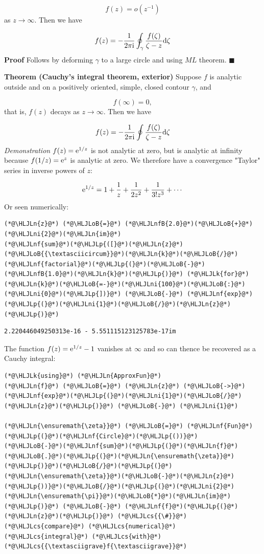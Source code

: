 \documentclass[12pt,a4paper]{article}
\newcommand{\HLJLk}[1]{\textcolor[RGB]{148,91,176}{\textbf{#1}}}
\newcommand{\HLJLn}[1]{#1}
\newcommand{\HLJLnf}[1]{\textcolor[RGB]{66,102,213}{#1}}
\newcommand{\HLJLnfB}[1]{\textcolor[RGB]{59,151,46}{#1}}
\newcommand{\HLJLni}[1]{\textcolor[RGB]{59,151,46}{#1}}
\newcommand{\HLJLoB}[1]{\textcolor[RGB]{102,102,102}{\textbf{#1}}}
\newcommand{\HLJLp}[1]{#1}
\newcommand{\HLJLcs}[1]{\textcolor[RGB]{153,153,119}{\textit{#1}}}
\def\D{ {\rm d} }
\def\I{ {\rm i} }
\def\E{ {\rm e} }
\begin{document}
\[
f(z) = o(z^{-1})
\]
as $z \rightarrow \infty$.  Then we have

\[
f(z) = -{1 \over 2 \pi \I} \oint_\gamma {f(\zeta) \over \zeta - z} \D \zeta
\]
\textbf{Proof} Follows by deforming $\gamma$ to a large circle and using $ML$ theorem. \ensuremath{\blacksquare}

\textbf{Theorem (Cauchy's integral theorem, exterior)} Suppose $f$ is analytic outside and on a positively oriented, simple, closed contour $\gamma$, and 

\[
f(\infty) = 0,
\]
that is, $f(z)$ decays as $z \rightarrow \infty$. Then we have

\[
f(z) = -{1 \over 2 \pi \I} \oint {f(\zeta) \over \zeta - z} \D \zeta
\]
\emph{Demonstration} $f(z) = \E^{1/z}$ is not analytic at zero, but is analytic at infinity because $f(1/z) = \E^z$ is analytic at zero. We therefore have a convergence "Taylor" series in inverse powers of $z$:

\[
\E^{1/z} = 1 + {1 \over z} + {1 \over 2 z^2} + {1 \over 3! z^3} + \cdots
\]
Or seen numerically:


\begin{lstlisting}
(*@\HLJLn{z}@*) (*@\HLJLoB{=}@*) (*@\HLJLnfB{2.0}@*)(*@\HLJLoB{+}@*)(*@\HLJLni{2}@*)(*@\HLJLn{im}@*)
(*@\HLJLnf{sum}@*)(*@\HLJLp{([}@*)(*@\HLJLn{z}@*)(*@\HLJLoB{{\textasciicircum}}@*)(*@\HLJLn{k}@*)(*@\HLJLoB{/}@*)(*@\HLJLnf{factorial}@*)(*@\HLJLp{(}@*)(*@\HLJLoB{-}@*)(*@\HLJLnfB{1.0}@*)(*@\HLJLn{k}@*)(*@\HLJLp{)}@*) (*@\HLJLk{for}@*) (*@\HLJLn{k}@*)(*@\HLJLoB{=-}@*)(*@\HLJLni{100}@*)(*@\HLJLoB{:}@*)(*@\HLJLni{0}@*)(*@\HLJLp{])}@*) (*@\HLJLoB{-}@*) (*@\HLJLnf{exp}@*)(*@\HLJLp{(}@*)(*@\HLJLni{1}@*)(*@\HLJLoB{/}@*)(*@\HLJLn{z}@*)(*@\HLJLp{)}@*)
\end{lstlisting}

\begin{lstlisting}
2.220446049250313e-16 - 5.551115123125783e-17im
\end{lstlisting}


The function $f(z) = \E^{1/z} - 1$ vanishes at $\infty$ and so can thence be recovered as a Cauchy integral:


\begin{lstlisting}
(*@\HLJLk{using}@*) (*@\HLJLn{ApproxFun}@*)
(*@\HLJLn{f}@*) (*@\HLJLoB{=}@*) (*@\HLJLn{z}@*) (*@\HLJLoB{->}@*) (*@\HLJLnf{exp}@*)(*@\HLJLp{(}@*)(*@\HLJLni{1}@*)(*@\HLJLoB{/}@*)(*@\HLJLn{z}@*)(*@\HLJLp{)}@*) (*@\HLJLoB{-}@*) (*@\HLJLni{1}@*)

(*@\HLJLn{\ensuremath{\zeta}}@*) (*@\HLJLoB{=}@*) (*@\HLJLnf{Fun}@*)(*@\HLJLp{(}@*)(*@\HLJLnf{Circle}@*)(*@\HLJLp{())}@*)
(*@\HLJLoB{-}@*)(*@\HLJLnf{sum}@*)(*@\HLJLp{(}@*)(*@\HLJLn{f}@*)(*@\HLJLoB{.}@*)(*@\HLJLp{(}@*)(*@\HLJLn{\ensuremath{\zeta}}@*)(*@\HLJLp{)}@*)(*@\HLJLoB{/}@*)(*@\HLJLp{(}@*)(*@\HLJLn{\ensuremath{\zeta}}@*)(*@\HLJLoB{-}@*)(*@\HLJLn{z}@*)(*@\HLJLp{))}@*)(*@\HLJLoB{/}@*)(*@\HLJLp{(}@*)(*@\HLJLni{2}@*)(*@\HLJLn{\ensuremath{\pi}}@*)(*@\HLJLoB{*}@*)(*@\HLJLn{im}@*)(*@\HLJLp{)}@*) (*@\HLJLoB{-}@*) (*@\HLJLnf{f}@*)(*@\HLJLp{(}@*)(*@\HLJLn{z}@*)(*@\HLJLp{)}@*) (*@\HLJLcs{{\#}}@*) (*@\HLJLcs{compare}@*) (*@\HLJLcs{numerical}@*) (*@\HLJLcs{integral}@*) (*@\HLJLcs{with}@*) (*@\HLJLcs{{\textasciigrave}f{\textasciigrave}}@*)
\end{lstlisting}
\end{document}
